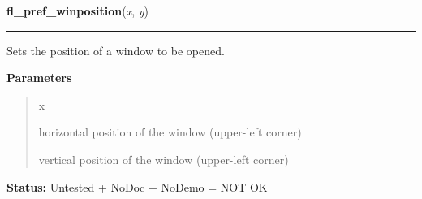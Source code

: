 \hspace{.8\funcindent}\begin{boxedminipage}{\funcwidth}

    \raggedright \textbf{fl\_pref\_winposition}(\textit{x}, \textit{y})

    \vspace{-1.5ex}

    \rule{\textwidth}{0.5\fboxrule}
\setlength{\parskip}{2ex}
    Sets the position of a window to be opened.

\setlength{\parskip}{1ex}
      \textbf{Parameters}
      \vspace{-1ex}

      \begin{quote}
        \begin{Ventry}{x}

          \item[x]

          horizontal position of the window (upper-left corner)

          \item[y]

          vertical position of the window (upper-left corner)

        \end{Ventry}

      \end{quote}

\textbf{Status:} Untested + NoDoc + NoDemo = NOT OK



    \end{boxedminipage}

    \label{xformslib:library:fl_winminsize}

    \vspace{0.5ex}


